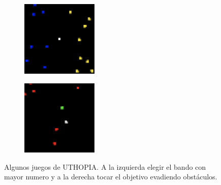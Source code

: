 \begin{figure}[ht!]
    \centering
    \begin{subfigure}
      \centering
      \includegraphics[width=0.4\textwidth]{Graphics/uthopia_count_war_1.png}
      \label{fig:uthopia1}
    \end{subfigure}%
    \begin{subfigure}
      \centering
      \includegraphics[width=0.4\textwidth]{Graphics/uthopia_evade_1.png}
      \label{fig:uthopia2}
    \end{subfigure}%
    \caption{Algunos juegos de UTHOPIA. A la izquierda elegir el bando con mayor numero y a la derecha tocar el objetivo evadiendo obstáculos.}
    \label{fig:uthopia}
\end{figure}


